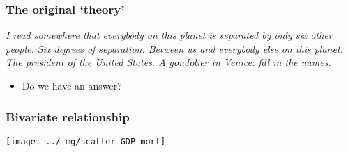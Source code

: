 \documentclass[aspectratio=43]{beamer}
\begin{document}
\begin{frame}
\frametitle{The original `theory'}
\centering

\textit{I read somewhere that everybody on this planet is separated by only six other people. Six degrees of separation. Between us and everybody else on this planet. The president of the United States. A gondolier in Venice. fill in the names.}\\\vspace{10pt}{\small Six Degrees of Separation, John Guare}

\vspace{20pt}

\begin{itemize}
  \item Do we have an answer?
\end{itemize}

\end{frame}




\begin{frame}
\frametitle{Bivariate relationship}
\centering

\texttt{[image: ../img/scatter\_GDP\_mort]}

\end{frame}




\end{document}
